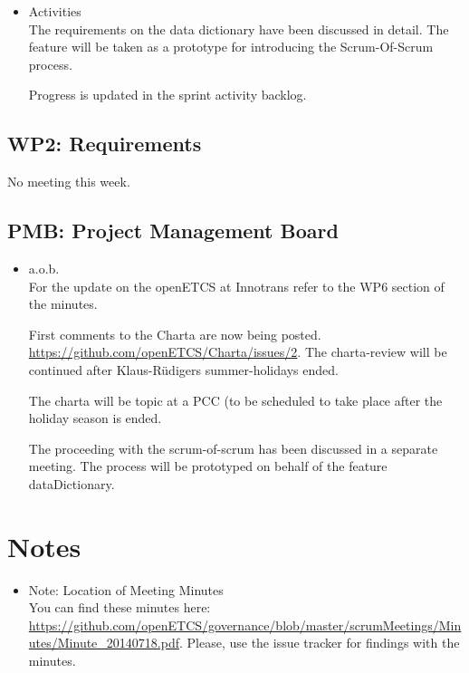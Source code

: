 \documentclass[a4paper, 11pt]{article}
\begin{document}
\begin{itemize}
\item Activities\\
The requirements on the data dictionary have been discussed in detail. The feature will be taken as a prototype for introducing the Scrum-Of-Scrum process.

Progress is updated in the sprint activity backlog.

\end{itemize}

\subsection{WP2: Requirements}


No meeting this week.


\subsection{PMB: Project Management Board}
\begin{itemize}
\item a.o.b.\\
For the update on the openETCS at Innotrans refer to the WP6 section of the minutes.

First comments to the Charta are now being posted. \url{https://github.com/openETCS/Charta/issues/2}. The charta-review will be continued after Klaus-R\"udigers summer-holidays ended. 

The charta will be topic at a PCC (to be scheduled to take place after the holiday season is ended.

The proceeding with the scrum-of-scrum has been discussed in a separate meeting. The process will be prototyped on behalf of the feature dataDictionary.

\end{itemize}

\section{Notes}
\begin{itemize}

\item Note: Location of Meeting Minutes\\
You can find these minutes here: \url{https://github.com/openETCS/governance/blob/master/scrumMeetings/Minutes/Minute_20140718.pdf}. Please, use the issue tracker for findings with the minutes.

\end{itemize}
\end{document}
